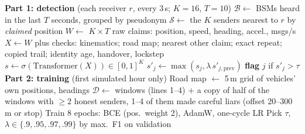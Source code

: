 \begin{algorithm}[t]
\caption{Receiver-side detection and training}\label{alg:detect}
\footnotesize
\begin{algorithmic}[1]
\Statex \textbf{Part 1: detection} (each receiver $r$, every 3\,s; $K{=}16$, $T{=}10$)
\State $\mathcal{B}\gets$ BSMs heard in the last $T$ seconds, grouped by pseudonym
\State $\mathcal{S}\gets$ the $K$ senders nearest to $r$ by \emph{claimed} position
\State $W\gets$ $K\times T$ raw claims: position, speed, heading, accel., msgs/s
\State $X\gets W$ plus checks: kinematics; road map; nearest other claim; exact repeat; copied trail; identity age, handover, lockstep
\State $s\gets\sigma(\mathrm{Transformer}(X))\in[0,1]^K$ 
  \State $s'_j\gets\max(s_j,\lambda\,s'_{j,\mathrm{prev}})$ 
  \State \textbf{flag} $j$ if $s'_j>\tau$
\EndFor
\Statex \textbf{Part 2: training} (first simulated hour only)
\State Road map $\gets$ 5\,m grid of vehicles' own positions, headings
\State $\mathcal{D}\gets$ windows (lines 1--4) $+$ a copy of half of the windows with $\geq 2$ honest senders, 1--4 of them made careful liars (offset 20--300\,m or stop)
\State Train 8 epochs: BCE (pos.\ weight 2), AdamW, one-cycle LR
\State Pick $\tau$, $\lambda\in\{.9,.95,.97,.99\}$ by max.\ F1 on validation
\end{algorithmic}
\end{algorithm}

